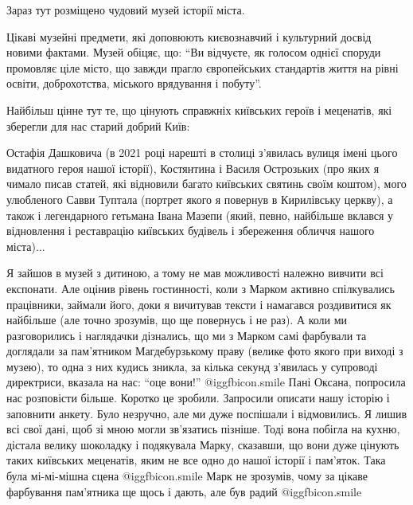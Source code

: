 Зараз тут розміщено чудовий музей історії міста. 

Цікаві музейні предмети, які доповюють києвознавчий і культурний досвід новими
фактами. Музей обіцяє, що: \enquote{Ви відчуєте, як голосом однієї споруди промовляє
ціле місто, що завжди прагло європейських стандартів життя на рівні освіти,
доброхотства, міського врядування і побуту}. 

Найбільш цінне тут те, що цінують справжніх київських героїв і меценатів, які
зберегли для нас старий добрий Київ: 

Остафія Дашковича (в 2021 році нарешті в столиці з’явилась вулиця імені цього
видатного героя нашої історії), Костянтина і Василя Острозьких (про яких я
чимало писав статей, які відновили багато київських святинь своїм коштом), мого
улюбленого Савви Туптала (портрет якого я повернув в Кирилівську церкву), а
також і легендарного гетьмана Івана Мазепи (який, певно, найбільше вклався у
відновлення і реставрацію київських будівель і збереження обличчя нашого
міста)...

Я зайшов в музей з дитиною, а тому не мав можливості належно вивчити всі
експонати. Але оцінив рівень гостинності, коли з Марком активно спілкувались
працівники, займали його, доки я вичитував тексти і намагався роздивитися як
найбільше (але точно зрозумів, що ще повернусь і не раз). А коли ми
разговорились і наглядачки дізнались, що ми з Марком самі фарбували та
доглядали за пам’ятником Магдебурзькому праву (велике фото якого при виході з
музею), то одна з них кудись зникла, за кілька секунд з’явилась у супроводі
директриси, вказала на нас: \enquote{оце вони!}  @igg{fbicon.smile}  Пані Оксана, попросила нас
розповісти більше. Коротко це зробили. Запросили описати нашу історію і
заповнити анкету. Було незручно, але ми дуже поспішали і відмовились. Я лишив
всі свої дані, щоб зі мною могли зв’язатись пізніше. Тоді вона побігла на
кухню, дістала велику шоколадку і подякувала Марку, сказавши, що вони дуже
цінують таких київських меценатів, яким не все одно до нашої історії і
пам’яток. Така була мі-мі-мішна сцена  @igg{fbicon.smile}  Марк не зрозумів, чому за цікаве
фарбування пам’ятника ще щось і дають, але був радий  @igg{fbicon.smile}  

